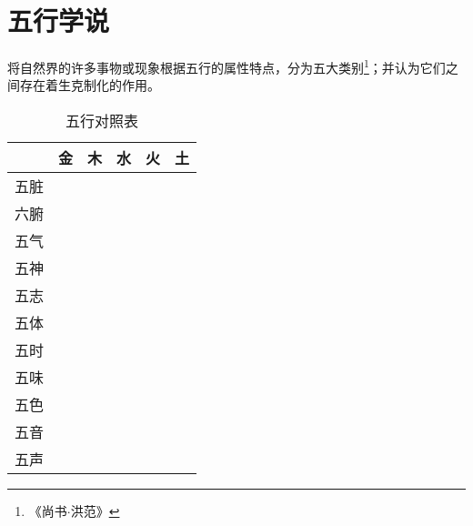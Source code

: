
\section{五行学说}
将自然界的许多事物或现象根据五行的属性特点，分为五大类别\footnote{《尚书$\cdot$洪范》}；并认为它们之间存在着生克制化的作用。

\begin{table}[H]
  \centering
  \caption[]{五行对照表}
  \begin{tabular}{|c|c|c|c|c|c|}
    \hline & 金 & 木& 水 & 火 & 土 \\
    \hline 五脏 & & & & & \\
    \hline 六腑 & & & & & \\
    \hline 五气 & & & & & \\
    \hline 五神 & & & & & \\
    \hline 五志 & & & & & \\
    \hline 五体 & & & & & \\
    \hline 五时 & & & & & \\
    \hline 五味 & & & & & \\
    \hline 五色 & & & & & \\
    \hline 五音 & & & & & \\
    \hline 五声 & & & & & \\
    \hline
  \end{tabular}
\end{table}
